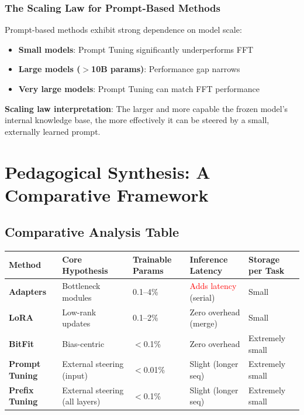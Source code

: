 \documentclass{article}
\begin{document}
\subsubsection{The Scaling Law for Prompt-Based Methods}

\begin{tcolorbox}[colback=blue!5!white, colframe=blue!75!black, title=Critical Finding: Model Scale Dependency]
Prompt-based methods exhibit strong dependence on model scale:

\begin{itemize}
\item \textbf{Small models}: Prompt Tuning significantly underperforms FFT
\item \textbf{Large models ($>$10B params)}: Performance gap narrows
\item \textbf{Very large models}: Prompt Tuning can match FFT performance
\end{itemize}

\textbf{Scaling law interpretation}: The larger and more capable the frozen model's internal knowledge base, the more effectively it can be steered by a small, externally learned prompt.
\end{tcolorbox}

\section{Pedagogical Synthesis: A Comparative Framework}

\subsection{Comparative Analysis Table}

\begin{center}
\small
\begin{tabular}{p{2cm}p{3cm}p{2cm}p{2cm}p{2cm}}
\toprule
\textbf{Method} & \textbf{Core Hypothesis} & \textbf{Trainable Params} & \textbf{Inference Latency} & \textbf{Storage per Task} \\
\midrule
\textbf{Adapters} & Bottleneck modules & 0.1--4\% & \textcolor{red}{Adds latency} (serial) & Small \\
\midrule
\textbf{LoRA} & Low-rank updates & 0.1--2\% & \textcolor{green!60!black}{Zero overhead} (merge) & Small \\
\midrule
\textbf{BitFit} & Bias-centric & $<$0.1\% & Zero overhead & Extremely small \\
\midrule
\textbf{Prompt Tuning} & External steering (input) & $<$0.01\% & Slight (longer seq) & Extremely small \\
\midrule
\textbf{Prefix Tuning} & External steering (all layers) & $<$0.1\% & Slight (longer seq) & Extremely small \\
\bottomrule
\end{tabular}
\end{center}
\end{document}
